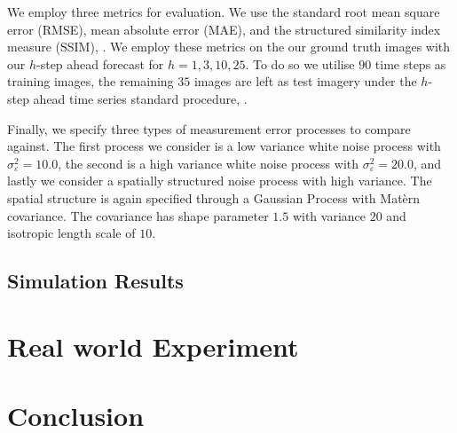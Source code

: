 \documentclass{article}
\begin{document}
We employ three metrics for evaluation. We use the standard root mean square error (RMSE), mean absolute error (MAE), and the structured similarity index measure (SSIM), \cite{zhou_wang_image_2004}. We employ these metrics on the our ground truth images with our $h$-step ahead forecast for $h = 1, 3, 10,25$. To do so we utilise $90$ time steps as training images, the remaining $35$ images are left as test imagery under the $h$-step ahead time series standard procedure, \cite{hyndman_forecasting_2018}. 

Finally, we specify three types of measurement error processes to compare against. The first process we consider is a low variance white noise process with $\sigma_\varepsilon^2 = 10.0$, the second is a high variance white noise process with $\sigma_\varepsilon^2 = 20.0$, and lastly we consider a spatially structured noise process with high variance. The spatial structure is again specified through a Gaussian Process with Mat\`{e}rn covariance. The covariance has shape parameter $1.5$ with variance $20$ and isotropic length scale of $10$.

\subsection{\label{ssec:sim_exp_results} Simulation Results}

\section{\label{sec:real_exp}Real world Experiment}
\section{\label{sec:conc}Conclusion}


\end{document}
